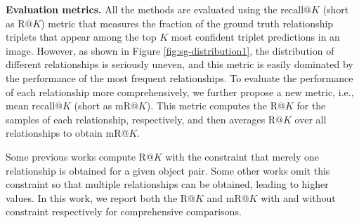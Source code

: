 \documentclass[10pt,twocolumn,letterpaper]{article}
\begin{document}
\noindent\textbf{Evaluation metrics. }
All the methods are evaluated using the recall@$K$ (short as R@$K$) metric that measures the fraction of the ground truth relationship triplets that appear among the top $K$ most confident triplet predictions in an image. However, as shown in Figure \ref{fig:sg-distribution1}, the distribution of different relationships is seriously uneven, and this metric is easily dominated by the performance of the most frequent relationships. To evaluate the performance of each relationship more comprehensively, we further propose a new metric, i.e., mean recall@$K$ (short as mR@$K$). This metric computes the R@$K$ for the samples of each relationship, respectively, and then averages R@$K$ over all relationships to obtain mR@$K$.  

Some previous works \cite{xu2017scene} compute R@$K$ with the constraint that merely one relationship is obtained for a given object pair. Some other works \cite{newell2017pixels} omit this constraint so that multiple relationships can be obtained, leading to higher values. In this work, we report both the R@$K$ and mR@$K$ with and without constraint respectively for comprehensive comparisons. 
\end{document}
